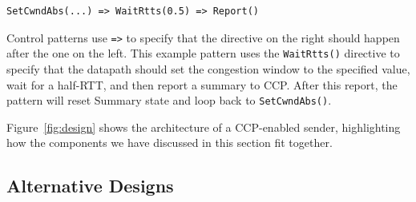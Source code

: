 \begin{verbatim}
SetCwndAbs(...) => WaitRtts(0.5) => Report()
\end{verbatim}
 
Control patterns use \texttt{=>} to specify that the directive on the right should happen after the one on the left. This example pattern uses the \texttt{WaitRtts()} directive to specify that the datapath should set the congestion window to the specified value, wait for a half-RTT, and then report a summary to CCP. After this report, the pattern will reset Summary state and loop back to \texttt{SetCwndAbs()}.
 
\fi

Figure~\ref{fig:design} shows the architecture of a CCP-enabled sender, highlighting how the components we have discussed in this section fit together. 

\subsection{Alternative Designs}
\label{sec:design:alternatives}





